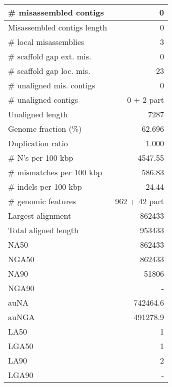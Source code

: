 \documentclass[12pt,a4paper]{article}
\begin{document}
\begin{table}[ht]
\begin{center}
\begin{tabular}{|l*{1}{|r}|}
\# misassembled contigs & 0 \\ \hline
Misassembled contigs length & 0 \\ \hline
\# local misassemblies & 3 \\ \hline
\# scaffold gap ext. mis. & 0 \\ \hline
\# scaffold gap loc. mis. & 23 \\ \hline
\# unaligned mis. contigs & 0 \\ \hline
\# unaligned contigs & 0 + 2 part \\ \hline
Unaligned length & 7287 \\ \hline
Genome fraction (\%) & 62.696 \\ \hline
Duplication ratio & 1.000 \\ \hline
\# N's per 100 kbp & 4547.55 \\ \hline
\# mismatches per 100 kbp & 586.83 \\ \hline
\# indels per 100 kbp & 24.44 \\ \hline
\# genomic features & 962 + 42 part \\ \hline
Largest alignment & 862433 \\ \hline
Total aligned length & 953433 \\ \hline
NA50 & 862433 \\ \hline
NGA50 & 862433 \\ \hline
NA90 & 51806 \\ \hline
NGA90 & - \\ \hline
auNA & 742464.6 \\ \hline
auNGA & 491278.9 \\ \hline
LA50 & 1 \\ \hline
LGA50 & 1 \\ \hline
LA90 & 2 \\ \hline
LGA90 & - \\ \hline
\end{tabular}
\end{center}
\end{table}
\end{document}
